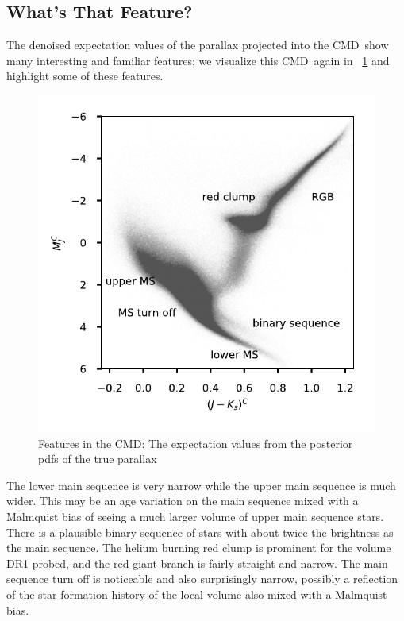 \documentclass[modern]{aastex61}
\newcommand{\acronym}[1]{{\small{#1}}}
\newcommand{\cmd}{\acronym{CMD}}
\begin{document}
\subsection{What's That Feature?}
The denoised expectation values of the parallax projected into the \cmd\ show many interesting and familiar features; we visualize this \cmd\ again in \figurename~\ref{fig:wtf} and highlight some of these features.
\begin{figure}
\centering
  \includegraphics[width=\textwidth]{whatsThatFeature.pdf}
\caption{Features in the \cmd: The expectation values from the posterior pdfs of the true parallax}
\label{fig:wtf}
\end{figure}

The lower main sequence is very narrow while the upper main sequence
is much wider. This may be an age variation on the main sequence mixed
with a Malmquist bias of seeing a much larger volume of upper main
sequence stars. There is a plausible binary sequence of stars with
about twice the brightness as the main sequence. The helium burning
red clump is prominent for the volume DR1 probed, and the red giant
branch is fairly straight and narrow. The main sequence turn off is
noticeable and also surprisingly narrow, possibly a reflection of the
star formation history of the local volume also mixed with a Malmquist
bias.
\end{document}
